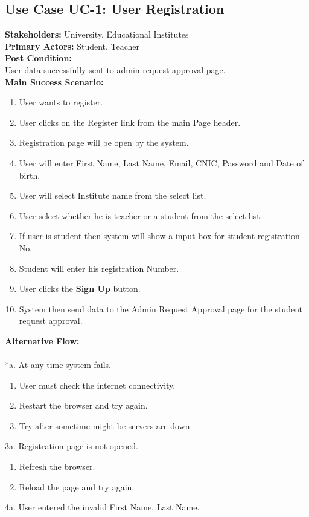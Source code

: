 \subsection{Use Case UC-1: User Registration}
\textbf{Stakeholders: } University, Educational Institutes \\
\textbf{Primary Actors: } Student, Teacher \\
\textbf{Post Condition: }\\
User data successfully sent to admin request approval page.\\
\textbf{Main Success Scenario: }
\begin{enumerate}
\item User wants to register.
\item User clicks on the Register link from the main Page header.
\item Registration page will be open by the system.
\item User will enter First Name, Last Name, Email, CNIC, Password and Date of birth.
\item User will select Institute name from the select list.
\item User select whether he is teacher or a student from the select list.
\item If user is student then system will show a input box for student registration No.
\item Student will enter his registration Number.
\item User clicks the \textbf{Sign Up} button.
\item System then send data to the Admin Request Approval page for the student request approval. 
\end{enumerate}
\textbf{Alternative Flow: }\\
\\
*a. At any time system fails.
\begin{enumerate}
\item User must check the internet connectivity.
\item Restart the browser and try again.
\item Try after sometime might be servers are down.
\end{enumerate}
3a. Registration page is not opened.
\begin{enumerate}
\item Refresh the browser.
\item Reload the page and try again.
\end{enumerate}
4a. User entered the invalid First Name, Last Name.
